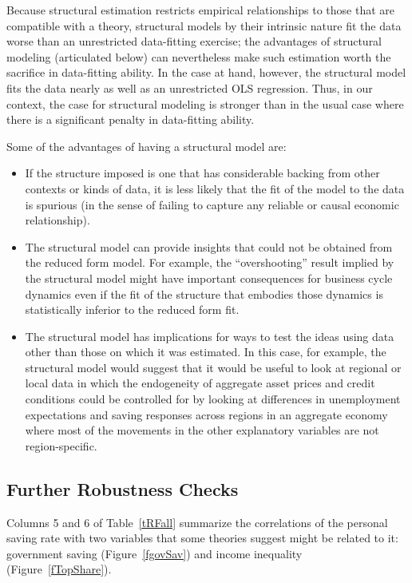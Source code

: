 \documentclass[titlepage]{\econtex}
\begin{document}
Because structural estimation restricts empirical relationships to those that are compatible with a theory, structural models by their intrinsic nature fit the data worse than an unrestricted data-fitting exercise; the advantages of structural modeling (articulated below) can nevertheless make such estimation worth the sacrifice in data-fitting ability.  In the case at hand, however, the structural model fits the data nearly as well as an unrestricted OLS regression.  Thus, in our context, the case for structural modeling is stronger than in the usual case where there is a significant penalty in data-fitting ability.

Some of the advantages of having a structural model are:
\begin{itemize}
\item If the structure imposed is one that has considerable backing from other contexts or kinds of data, it is less likely that the fit of the model to the data is spurious (in the sense of failing to capture any reliable or causal economic relationship).
\item The structural model can provide insights that could not be obtained from the reduced form model.  For example, the ``overshooting'' result implied by the structural model might have important consequences for business cycle dynamics even if the fit of the structure that embodies those dynamics is statistically inferior to the reduced form fit.
  \item The structural model has implications for ways to test the ideas using data other than those on which it was estimated.  In this case, for example, the structural model would suggest that it would be useful to look at regional or local data in which the endogeneity of aggregate asset prices and credit conditions could be controlled for by looking at differences in unemployment expectations and saving responses across regions in an aggregate economy where most of the movements in the other explanatory variables are not region-specific.
  \end{itemize}

\subsection{Further Robustness Checks}

Columns 5 and 6 of Table~\ref{tRFall} summarize the correlations of the personal saving rate with two variables that some theories suggest might be related to it: government saving (Figure~\ref{fgovSav}) and income inequality (Figure~\ref{fTopShare}).
\end{document}
